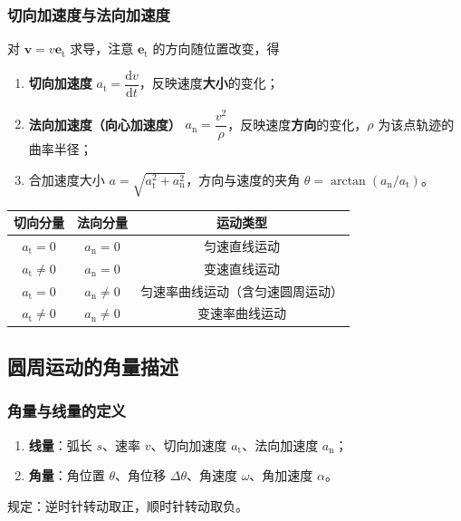     \subsubsection{切向加速度与法向加速度}
    对 $\boldsymbol{v}=v\boldsymbol{e}_{\mathrm{t}}$ 求导，注意 $\boldsymbol{e}_{\mathrm{t}}$ 的方向随位置改变，得
    \begin{enumerate}
        \item \textbf{切向加速度} $a_{\mathrm{t}}=\dfrac{\mathrm{d}v}{\mathrm{d}t}$，反映速度\textbf{大小}的变化；
        \item \textbf{法向加速度（向心加速度）} $a_{\mathrm{n}}=\dfrac{v^{2}}{\rho}$，反映速度\textbf{方向}的变化，$\rho$ 为该点轨迹的曲率半径；
        \item 合加速度大小 $a=\sqrt{a_{\mathrm{t}}^{2}+a_{\mathrm{n}}^{2}}$，方向与速度的夹角 $\theta=\arctan\left(a_{\mathrm{n}}/a_{\mathrm{t}}\right)$。
    \end{enumerate}

    \begin{center}
    \begin{tabular}{ccc}
    \toprule
    切向分量 & 法向分量 & 运动类型 \\
    \midrule
    $a_{\mathrm{t}}=0$ & $a_{\mathrm{n}}=0$ & 匀速直线运动 \\
    $a_{\mathrm{t}}\neq0$ & $a_{\mathrm{n}}=0$ & 变速直线运动 \\
    $a_{\mathrm{t}}=0$ & $a_{\mathrm{n}}\neq0$ & 匀速率曲线运动（含匀速圆周运动） \\
    $a_{\mathrm{t}}\neq0$ & $a_{\mathrm{n}}\neq0$ & 变速率曲线运动 \\
    \bottomrule
    \end{tabular}
    \end{center}

    \subsection{圆周运动的角量描述}
        \subsubsection{角量与线量的定义}
        \begin{enumerate}
            \item \textbf{线量}：弧长 $s$、速率 $v$、切向加速度 $a_{\mathrm{t}}$、法向加速度 $a_{\mathrm{n}}$；
            \item \textbf{角量}：角位置 $\theta$、角位移 $\Delta\theta$、角速度 $\omega$、角加速度 $\alpha$。
        \end{enumerate}
        规定：逆时针转动取正，顺时针转动取负。

